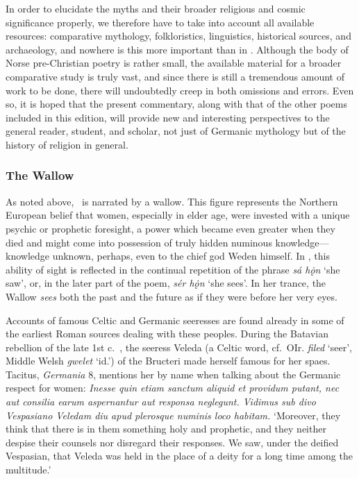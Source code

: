 In order to elucidate the myths and their broader religious and cosmic significance properly, we therefore have to take into account all available resources: comparative mythology, folkloristics, linguistics, historical sources, and archaeology, and nowhere is this more important than in \Voluspa.  Although the body of Norse pre-Christian poetry is rather small, the available material for a broader comparative study is truly vast, and since there is still a tremendous amount of work to be done, there will undoubtedly creep in both omissions and errors.  Even so, it is hoped that the present commentary, along with that of the other poems included in this edition, will provide new and interesting perspectives to the general reader, student, and scholar, not just of Germanic mythology but of the history of religion in general.

\subsubsection{The Wallow}

As noted above, \Voluspa\ is narrated by a wallow.  This figure represents the Northern European belief that women, especially in elder age, were invested with a unique psychic or prophetic foresight, a power which became even greater when they died and might come into possession of truly hidden numinous knowledge---knowledge unknown, perhaps, even to the chief god Weden himself.  In \Voluspa, this ability of sight is reflected in the continual repetition of the phrase \emph{sá hǫ̇n} ‘she saw’, or, in the later part of the poem, \emph{sér hǫ̇n} ‘she sees’.  In her trance, the Wallow \emph{sees} both the past and the future as if they were before her very eyes.

Accounts of famous Celtic and Germanic seeresses are found already in some of the earliest Roman sources dealing with these peoples.  During the Batavian rebellion of the late 1st c.~\ce, the seeress Veleda (a Celtic word, cf.~OIr. \emph{filed} ‘seer’, Middle Welsh \emph{gwelet} ‘id.’) of the Bructeri made herself famous for her spaes.  Tacitus, \emph{Germania} 8, mentions her by name when talking about the Germanic respect for women: \emph{Inesse quin etiam sanctum aliquid et providum putant, nec aut consilia earum aspernantur aut responsa neglegunt.  Vidimus sub divo Vespasiano Veledam diu apud plerosque numinis loco habitam.} ‘Moreover, they think that there is in them something holy and prophetic, and they neither despise their counsels nor disregard their responses.  We saw, under the deified Vespasian, that Veleda was held in the place of a deity for a long time among the multitude.’

